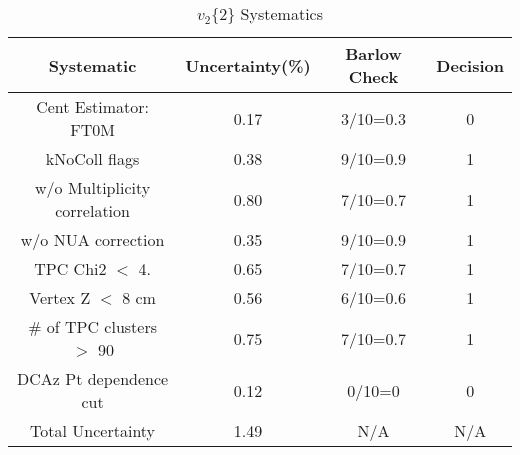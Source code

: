 \begin{table}[htbp]
\caption{$v_2\{2\}$ Systematics}
\label{tab:Sys_v22}
\centering
\begin{tabular}{|c|c|c|c|}
\hline
Systematic & Uncertainty(\%) & Barlow Check & Decision \\
\hline
Cent Estimator: FT0M & 0.17 & 3/10=0.3 & 0 \\
kNoColl flags & 0.38 & 9/10=0.9 & 1 \\
w/o Multiplicity correlation & 0.80 & 7/10=0.7 & 1 \\
w/o NUA correction & 0.35 & 9/10=0.9 & 1 \\
TPC Chi2 $<$ 4. & 0.65 & 7/10=0.7 & 1 \\
Vertex Z $<$ 8 cm & 0.56 & 6/10=0.6 & 1 \\
\# of TPC clusters $>$ 90 & 0.75 & 7/10=0.7 & 1 \\
DCAz Pt dependence cut & 0.12 & 0/10=0 & 0 \\
\hline
Total Uncertainty & 1.49 & N/A & N/A \\
\hline
\end{tabular}
\end{table}

